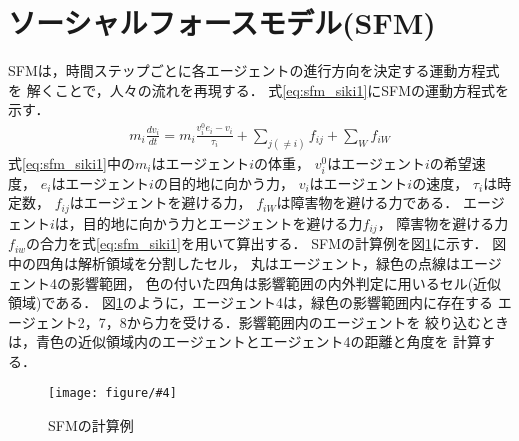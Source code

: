 \documentclass{maelab_y}
\newcommand{\figtb}[5]{ %
\begin{figure}[hbtp]
  \begin{center}
    \texttt{[image: figure/\#4]}
    \caption{#1}
    \label{fig:#5}
  \end{center}
\end{figure}
}%
\newcommand{\分類条件}{%
\begin{table}[t]
\begin{center}
\caption{進行方向を分類する条件}
\ecaption{Classification condition of moving direction $e_{i}$.}
\label{tb:hantei_jouken}
\begin{tabular}{c|c|c|c|c}
\hline \hline
			& 右 & 左 & 上 & 下 \\ \hline
パターン2   & $\frac{1}{\sqrt{2}} < e_x \leq 1  $
		    & $ -1 \leq e_x < \frac{-1}{\sqrt{2}}$ 
		    & $ \frac{-1}{\sqrt{2}} < e_x < \frac{1}{\sqrt{2}} $ 
		    & $ \frac{-1}{2} < e_x < \frac{1}{2} $ \\
パターン3   & $\frac{-1}{2} < e_y < \frac{1}{2} $ 
		    & $\frac{-1}{2} < e_y < \frac{1}{2} $
            & $ \frac{1}{\sqrt{2}} < e_y \leq 1$
		    & $ -1 \leq e_y < \frac{-1}{\sqrt{2}} $ \\
\hline
\multirow{2}{*}{パターン4}   
			& $R_x \geq A_x$ & $R_x < A_x$ & $R_y \geq A_y$ & $R_y < A_y $ \\
	        &  $L_x \geq A_x$ & $L_x < A_x$ & $L_y \geq A_y$ & $L_y < A_y$ \\
\hline
\multirow{2}{*}{パターン5}   
 			& $R_x \geq x_1$ & $R_x < x_2$ & $R_y \geq y_1$ & $R_y < y_2 $ \\
			& $L_x \geq x_1$ & $L_x < x_2$ & $L_y \geq y_1$ & $L_y < y_2 $ \\
\hline
パターン6   & $ \cos(\frac{1}{2}\theta_{view}) \leq  e_y $ 
			& $ e_y \leq -\cos(\frac{1}{2}\theta_{view})$ 
			& $ \sin(\frac{1}{2}(\pi - \theta_{view})) \leq e_x $ 
			& $ e_x \leq \sin(\frac{1}{2}(\pi - \theta_{view}))  $ \\
\hline
\end{tabular}
\end{center}
\end{table}
}%
\newcommand{\距離計算new}{%
  \begin{table}[hbtp]
    \begin{center}
    \caption{エージェント間距離の計算回数[$10^{10}$回]}
    \label{tb:keisan_kaisu}
    \begin{tabular}{c|llllll}
    \hline \hline
    \multirow{2}{*}{人数}   & \multicolumn{6}{c}{パターン}                                                                                                                                                             \\ \cline{2-7} 
                          & \multicolumn{1}{c|}{1}    & \multicolumn{1}{c|}{2}               & \multicolumn{1}{c|}{3}      & \multicolumn{1}{c|}{4}      & \multicolumn{1}{c|}{5}      & \multicolumn{1}{c}{6}    \\ \hline
    \multirow{2}{*}{3000} & \multicolumn{1}{r|}{5.1}  & \multicolumn{1}{r|}{\textbf{3.9}}    & \multicolumn{1}{r|}{4.0}    & \multicolumn{1}{r|}{4.4}    & \multicolumn{1}{r|}{4.1}    & \multicolumn{1}{r}{4.4}  \\
                          & \multicolumn{1}{l|}{}     & \multicolumn{1}{l|}{\textbf{(24\%)}} & \multicolumn{1}{l|}{(23\%)} & \multicolumn{1}{l|}{(15\%)} & \multicolumn{1}{l|}{(21\%)} & (15\%)                   \\ \hline
    \multirow{2}{*}{5000} & \multicolumn{1}{r|}{14.4} & \multicolumn{1}{r|}{\textbf{10.9}}   & \multicolumn{1}{r|}{11.1}   & \multicolumn{1}{r|}{12.2}   & \multicolumn{1}{r|}{11.4}   & \multicolumn{1}{r}{12.2} \\
                          & \multicolumn{1}{l|}{}     & \multicolumn{1}{l|}{\textbf{(24\%)}} & \multicolumn{1}{l|}{(23\%)} & \multicolumn{1}{l|}{(15\%)} & \multicolumn{1}{l|}{(21\%)} & (15\%)                   \\ \hline
    \multirow{2}{*}{7500} & \multicolumn{1}{r|}{33.1} & \multicolumn{1}{r|}{\textbf{25.2}}   & \multicolumn{1}{r|}{25.8}   & \multicolumn{1}{r|}{28.3}   & \multicolumn{1}{r|}{26.7}   & \multicolumn{1}{r}{28.3} \\
                          & \multicolumn{1}{l|}{}     & \multicolumn{1}{l|}{\textbf{(24\%)}} & \multicolumn{1}{l|}{(22\%)} & \multicolumn{1}{l|}{(15\%)} & \multicolumn{1}{l|}{(20\%)} & (15\%)                   \\ \hline
    \end{tabular}
    \end{center}
    \end{table}
}%
\newcommand{\粒子数}{%
\begin{table}[hbtp]
  \begin{center}
    \caption{各配置の詳細}
    \label{tb:haichi_para}
    \begin{tabular}{c|c|c}
      \hline \hline
      & 教室 & 演習室 \\ \hline 
      エージェント数[人] & 96 & 204 \\ \hline
      壁粒子数[個] & 1037 & 1454\\ \hline
      経由地数[個] & 12   & 26 \\ \hline
      解析領域 & $50m\times50m$ & $50m\times50m$ \\ \hline
    \end{tabular}
  \end{center}
\end{table}
}%
\newcommand{\評価環境}{%
\begin{table}[hbtp]
  \begin{center}
    \caption{各配置の詳細}
    \label{tb:haichi_para}
    \begin{tabular}{c|c|c}
      \hline \hline
                 & マシン1                & マシン2 \\ \hline 
      CPU        & Intel Xeon E5-2687W & Intel Xeon E5-2667W \\ \hline
      メモリ     & 64GB                   & 64GB \\ \hline
      OS         & Linux 4.12.9            & Linux 6.5.8 \\ \hline
      コンパイラ & gcc 7.2.0             & gcc 13.2.0 \\ \hline
    \end{tabular}
  \end{center}
\end{table}
}%
\newcommand{\判定条件new}{%
  \begin{table}[hbtp]
    \centering
		\caption{パターンごとの進行方向分類条件}
		\label{tb:joken}
		{\scriptsize
    \begin{tabular}{Wc{0.5em}|cccWc{8em}}
    \hline \hline
                          & \multicolumn{1}{c|}{パターン2，3} & \multicolumn{1}{c|}{パターン4}   & \multicolumn{1}{c|}{パターン5}   & パターン6                   \\ \hline
    \multirow{2}{*}{右}    & \multicolumn{1}{c|}{$\frac{1}{\sqrt{2}} < e_x \leq 1$}  & \multicolumn{1}{c|}{$R_x \geq A_x$}  & \multicolumn{1}{c|}{$R_x \geq x_1$}  & \multirow{2}{*}{$ \cos(\frac{1}{2}\theta_v) \leq  e_y $} \\
                          & \multicolumn{1}{c|}{$\frac{-1}{2} < e_y < \frac{1}{2} $}   & \multicolumn{1}{l|}{$L_x \geq A_x$} & \multicolumn{1}{l|}{$L_x \geq x_1$} &                     \\ \hline
    \multirow{2}{*}{左}    & \multicolumn{1}{c|}{$ -1 \leq e_x < \frac{-1}{\sqrt{2}}$}  & \multicolumn{1}{c|}{$R_x < A_x$}  & \multicolumn{1}{c|}{$R_x < x_2$}  & \multirow{2}{*}{$ e_y \leq -\cos(\frac{1}{2}\theta_{v})$} \\
                          & \multicolumn{1}{l|}{$\frac{-1}{2} < e_y < \frac{1}{2} $}   & \multicolumn{1}{l|}{$L_x < A_x$} & \multicolumn{1}{l|}{$L_x < x_2$ } &                     \\ \hline
    \multirow{2}{*}{上}    & \multicolumn{1}{c|}{$ \frac{-1}{\sqrt{2}} < e_x < \frac{1}{\sqrt{2}}$}  & \multicolumn{1}{c|}{$R_y \geq A_y$ }  & \multicolumn{1}{c|}{$R_y \geq y_1$ }  & \multirow{2}{*}{$ \sin(\frac{1}{2}(\theta_{\pi - v})) \leq e_x$} \\
                          & \multicolumn{1}{l|}{$ \frac{1}{\sqrt{2}} < e_y \leq 1$}   & \multicolumn{1}{l|}{$L_y \geq A_y$} & \multicolumn{1}{l|}{$L_y \geq y_1$} &                     \\ \hline
    \multirow{2}{*}{下}    & \multicolumn{1}{c|}{$ \frac{-1}{2} < e_x < \frac{1}{2} $}  & \multicolumn{1}{c|}{$R_y < A_y $}  & \multicolumn{1}{c|}{$R_y < y_2 $ }  & \multirow{2}{*}{$ e_x \leq \sin(\frac{1}{2}(\theta_{\pi - v}))$} \\
                          & \multicolumn{1}{l|}{$ -1 \leq e_y < \frac{-1}{\sqrt{2}} $}   & \multicolumn{1}{l|}{$L_y < A_y$} & \multicolumn{1}{l|}{$L_y < y_2 $ } &                     \\ \hline
    \end{tabular}
		}
    \end{table}
}%
\begin{document}
\section{ソーシャルフォースモデル(SFM)}
SFMは，時間ステップごとに各エージェントの進行方向を決定する運動方程式を
解くことで，人々の流れを再現する．
式\eqref{eq:sfm_siki1}にSFMの運動方程式を示す．
%
\begin{align} \label{eq:sfm_siki1}
  m_i \frac{dv_i}{dt} = m_i \frac{v_i^0 e_i - v_i}{\tau_i}
  +\sum_{j(\neq i)}f_{ij}+\sum_{W}f_{iW}
\end{align}
%
式\eqref{eq:sfm_siki1}中の$m_i$はエージェント$i$の体重，
$v_i^0$はエージェント$i$の希望速度，
$e_i$はエージェント$i$の目的地に向かう力，
$v_i$はエージェント$i$の速度，
$\tau_i$は時定数，
$f_{ij}$はエージェントを避ける力，
$f_{iW}$は障害物を避ける力である．
エージェント$i$は，目的地に向かう力とエージェントを避ける力$f_{ij}$，
障害物を避ける力$f_{iw}$の合力を式\eqref{eq:sfm_siki1}を用いて算出する．
SFMの計算例を図\ref{fig:sfm_ex}に示す．
図中の四角は解析領域を分割したセル，
丸はエージェント，緑色の点線はエージェント4の影響範囲，
色の付いた四角は影響範囲の内外判定に用いるセル(近似領域)である．
図\ref{fig:sfm_ex}のように，エージェント4は，緑色の影響範囲内に存在する
エージェント2，7，8から力を受ける．影響範囲内のエージェントを
絞り込むときは，青色の近似領域内のエージェントとエージェント4の距離と角度を
計算する．

\figtb{SFMの計算例}{}{8}{20231226_sfm_ex.eps}{sfm_ex}
\end{document}
